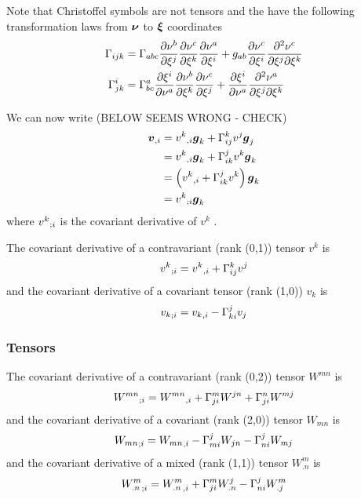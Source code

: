 Note that Christoffel symbols are not tensors and the have the following
transformation laws from $\boldsymbol{\nu}$ to $\boldsymbol{\xi}$ coordinates
\begin{align}
   \Gamma_{ijk}  &=
   \Gamma_{abc}  \dfrac{\partial \nu^{b}}{\partial \xi^{j}}  \dfrac{\partial \nu^{c}}{\partial \xi^{k}}  \dfrac{\partial \nu^{a}}{\partial \xi^{i}} +
  g_{ab} \dfrac{\partial \nu^{c}}{\partial \xi^{i}}  \dfrac{\partial^{2} \nu^{c}}{\partial \xi^{j} \partial \xi^{k}}  \\
   \Gamma^{i}_{jk}  &=  \Gamma^{a}_{bc}  \dfrac{\partial \xi^{i}}{\partial \nu^{a}}  \dfrac{\partial \nu^{b}}{\partial \xi^{k}}  \dfrac{\partial \nu^{c}}{\partial \xi^{j}} +
   \dfrac{\partial \xi^{i}}{\partial \nu^{a}}  \dfrac{\partial^{2} \nu^{a}}{\partial \xi^{j} \partial \xi^{k}}  \\
\end{align}

We can now write (BELOW SEEMS WRONG - CHECK)
\begin{equation}
  \begin{split}
     {\ensuremath{\boldsymbol{v}}}_{,i} &= {v^{k}}_{,i} \boldsymbol{g}_{k}+ \Gamma^{k}_{ij} v^{j}\boldsymbol{g}_{j}\\
    &= {v^{k}}_{,i} \boldsymbol{g}_{k}+ \Gamma^{j}_{ik} v^{k}\boldsymbol{g}_{k}\\
    &=\left(  {v^{k}}_{,i} + \Gamma^{j}_{ik} v^{k} \right)\boldsymbol{g}_{k}\\
    &= {v^{k}}_{;i} \boldsymbol{g}_{k}
  \end{split}
\end{equation}
where $ {v^{k}}_{;i} $ is the covariant derivative of $v^{k}$ . 

The covariant derivative of a contravariant (rank (0,1)) tensor $v^{k}$ is
\begin{equation}
   {v^{k}}_{;i}  = {v^{k}}_{,i} + \Gamma^{k}_{ij} v^{j}
\end{equation}
and the covariant derivative of a covariant tensor  (rank (1,0)) $v_{k}$ is
\begin{equation}
   {v_{k}}_{;i}  = {v_{k}}_{,i} - \Gamma^{j}_{ki} v_{j}
\end{equation}

\subsubsection{Tensors}

The covariant derivative of a contravariant (rank (0,2)) tensor $W^{mn}$ is
\begin{equation}
   {W^{mn}}_{;i} = {W^{mn}}_{,i} + \Gamma^{m}_{ji} W^{jn}+ \Gamma^{n}_{ji} W^{mj}
\end{equation}
and the covariant derivative of a covariant (rank (2,0)) tensor $W_{mn}$ is
\begin{equation}
   {W_{mn}}_{;i} = {W_{mn}}_{,i} - \Gamma^{j}_{mi} W_{jn}- \Gamma^{j}_{ni} W_{mj}
\end{equation}
and the covariant derivative of a mixed (rank (1,1)) tensor $W^{m}_{.n}$ is
\begin{equation}
   {W^{m}_{.n}}_{;i} = {W^{m}_{.n}}_{,i} + \Gamma^{m}_{ji} W^{j}_{.n}- \Gamma^{j}_{ni} W^{m}_{.j}
\end{equation}

